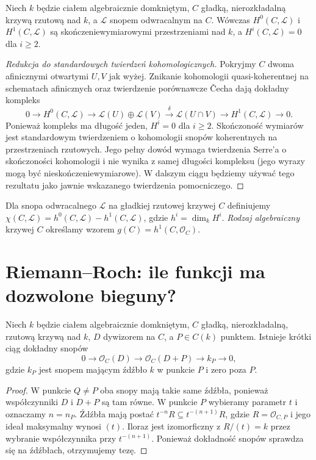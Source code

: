\begin{twierdzenie}
\label{tw:curve-coh}
Niech $k$ będzie ciałem algebraicznie domkniętym,
$C$ gładką, nierozkładalną krzywą rzutową nad $k$,
a $\mathcal L$ snopem odwracalnym na $C$.
Wówczas $H^0(C,\mathcal L)$ i $H^1(C,\mathcal L)$ są
skończeniewymiarowymi przestrzeniami nad $k$,
a $H^i(C,\mathcal L)=0$ dla $i\ge2$.
\end{twierdzenie}
\begin{proof}[Redukcja do standardowych twierdzeń kohomologicznych]
Pokryjmy $C$ dwoma afinicznymi otwartymi $U,V$
jak wyżej. Znikanie kohomologii quasi-koherentnej
na schematach afinicznych oraz twierdzenie
porównawcze Čecha dają dokładny kompleks
\[
 0\longrightarrow H^0(C,\mathcal L)
 \longrightarrow\mathcal L(U)\oplus\mathcal L(V)
 \xrightarrow{\delta}\mathcal L(U\cap V)
 \longrightarrow H^1(C,\mathcal L)\longrightarrow0.
\]
Ponieważ kompleks ma długość jeden,
$H^i=0$ dla $i\ge2$.
Skończoność wymiarów jest standardowym
twierdzeniem o kohomologii snopów koherentnych
na przestrzeniach rzutowych. Jego pełny dowód
wymaga twierdzenia Serre'a o skończoności
kohomologii i nie wynika z samej długości
kompleksu (jego wyrazy mogą być nieskończeniewymiarowe).
W dalszym ciągu będziemy używać tego rezultatu
jako jawnie wskazanego twierdzenia pomocniczego.
\end{proof}

\begin{definicja}
Dla snopa odwracalnego $\mathcal L$ na gładkiej
rzutowej krzywej $C$ definiujemy
$\chi(C,\mathcal L)=h^0(C,\mathcal L)-h^1(C,\mathcal L)$,
gdzie $h^i=\dim_kH^i$. \emph{Rodzaj algebraiczny}
krzywej $C$ określamy wzorem
$g(C)=h^1(C,\mathcal O_C)$.
\end{definicja}

\section{Riemann--Roch: ile funkcji ma dozwolone bieguny?}
\label{sec:rr}

\begin{lemat}
\label{lem:exact-point}
Niech $k$ będzie ciałem algebraicznie domkniętym,
$C$ gładką, nierozkładalną, rzutową krzywą nad $k$,
$D$ dywizorem na $C$, a $P\in C(k)$ punktem.
Istnieje krótki ciąg dokładny snopów
\[
 0\longrightarrow\mathcal O_C(D)
 \longrightarrow\mathcal O_C(D+P)
 \longrightarrow k_P\longrightarrow0,
\]
gdzie $k_P$ jest snopem mającym źdźbło $k$
w punkcie $P$ i zero poza $P$.
\end{lemat}
\begin{proof}
W punkcie $Q\ne P$ oba snopy mają takie same
źdźbła, ponieważ współczynniki $D$ i $D+P$
są tam równe. W punkcie $P$ wybieramy parametr
$t$ i oznaczamy $n=n_P$. Źdźbła mają postać
$t^{-n}R\subseteq t^{-(n+1)}R$, gdzie
$R=\mathcal O_{C,P}$ i jego ideał maksymalny
wynosi $(t)$. Iloraz jest izomorficzny z
$R/(t)=k$ przez wybranie współczynnika przy
$t^{-(n+1)}$. Ponieważ dokładność snopów
sprawdza się na źdźbłach, otrzymujemy tezę.
\end{proof}


